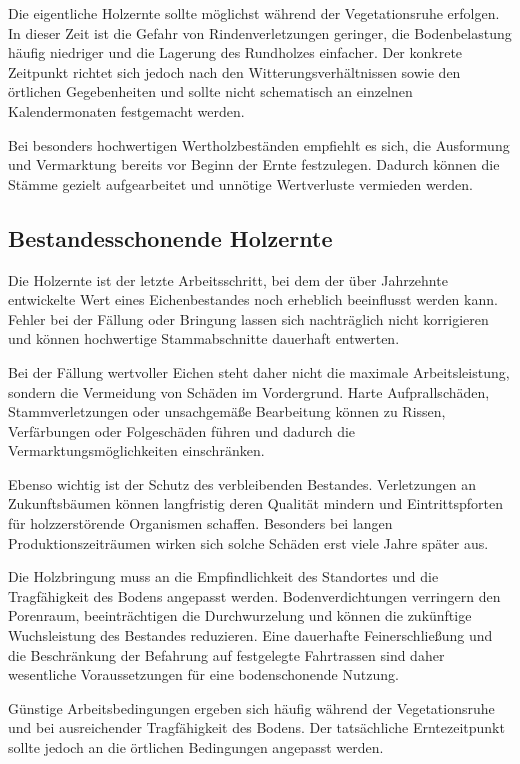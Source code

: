\documentclass[twocolumn, bibliography=totoc, abstract=true]{scrartcl}
\begin{document}
Die eigentliche Holzernte sollte möglichst während der Vegetationsruhe erfolgen. In dieser Zeit ist die Gefahr von Rindenverletzungen geringer, die Bodenbelastung häufig niedriger und die Lagerung des Rundholzes einfacher. Der konkrete Zeitpunkt richtet sich jedoch nach den Witterungsverhältnissen sowie den örtlichen Gegebenheiten und sollte nicht schematisch an einzelnen Kalendermonaten festgemacht werden.

Bei besonders hochwertigen Wertholzbeständen empfiehlt es sich, die Ausformung und Vermarktung bereits vor Beginn der Ernte festzulegen. Dadurch können die Stämme gezielt aufgearbeitet und unnötige Wertverluste vermieden werden.

\subsection{Bestandesschonende Holzernte}

Die Holzernte ist der letzte Arbeitsschritt, bei dem der über Jahrzehnte entwickelte Wert eines Eichenbestandes noch erheblich beeinflusst werden kann. Fehler bei der Fällung oder Bringung lassen sich nachträglich nicht korrigieren und können hochwertige Stammabschnitte dauerhaft entwerten.

Bei der Fällung wertvoller Eichen steht daher nicht die maximale Arbeitsleistung, sondern die Vermeidung von Schäden im Vordergrund. Harte Aufprallschäden, Stammverletzungen oder unsachgemäße Bearbeitung können zu Rissen, Verfärbungen oder Folgeschäden führen und dadurch die Vermarktungsmöglichkeiten einschränken.

Ebenso wichtig ist der Schutz des verbleibenden Bestandes. Verletzungen an Zukunftsbäumen können langfristig deren Qualität mindern und Eintrittspforten für holzzerstörende Organismen schaffen. Besonders bei langen Produktionszeiträumen wirken sich solche Schäden erst viele Jahre später aus.

Die Holzbringung muss an die Empfindlichkeit des Standortes und die Tragfähigkeit des Bodens angepasst werden. Bodenverdichtungen verringern den Porenraum, beeinträchtigen die Durchwurzelung und können die zukünftige Wuchsleistung des Bestandes reduzieren. Eine dauerhafte Feinerschließung und die Beschränkung der Befahrung auf festgelegte Fahrtrassen sind daher wesentliche Voraussetzungen für eine bodenschonende Nutzung.

Günstige Arbeitsbedingungen ergeben sich häufig während der Vegetationsruhe und bei ausreichender Tragfähigkeit des Bodens. Der tatsächliche Erntezeitpunkt sollte jedoch an die örtlichen Bedingungen angepasst werden.
\end{document}
